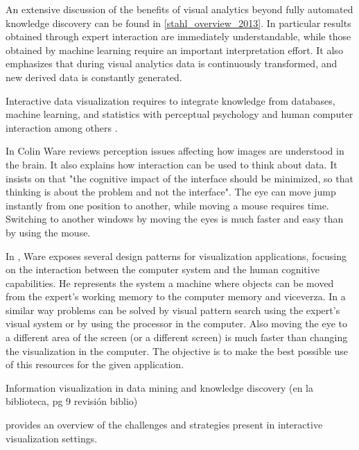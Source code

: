 An extensive discussion of the benefits of visual analytics beyond fully automated knowledge discovery can be found in \ref{stahl_overview_2013}. In particular results obtained through expert interaction are immediately understandable, while those obtained by machine learning require an important interpretation effort. It also emphasizes that during visual analytics data is continuously transformed, and new derived data is constantly generated.

Interactive data visualization requires to integrate knowledge from databases, machine learning, and statistics with perceptual psychology and human computer interaction among others \autocite{ward_interactive_2010}.

In \autocite{ware_information_2004} Colin Ware reviews perception issues affecting how images are understood in the brain. It also explains how interaction can be used to think about data. It insists on that "the cognitive impact of the interface should be minimized, so that thinking is about the problem and not the interface". The eye can move jump instantly from one position to another, while moving a mouse requires time. Switching to another windows by moving the eyes is much faster and easy than by using the mouse.

		
In \autocite{ware_visual_2013}, Ware exposes several design patterns for visualization applications, focusing on the interaction between the computer system and the human cognitive capabilities. He represents the system a machine where objects can be moved from the expert's working memory to the computer memory and viceverza. In a similar way problems can be solved by visual pattern search using the expert's visual system or by using the processor in the computer. Also moving the eye to a different area of the screen (or a different screen) is much faster than changing the visualization in the computer.
The objective is to make the best possible use of this resources for the given application. 


\autocite{fayyad_information_2002}	Information visualization in data mining and knowledge discovery (en la biblioteca, pg 9 revisión biblio)

\autocite{spence_information_2007} provides an overview of the challenges and strategies present in interactive visualization settings.
	
